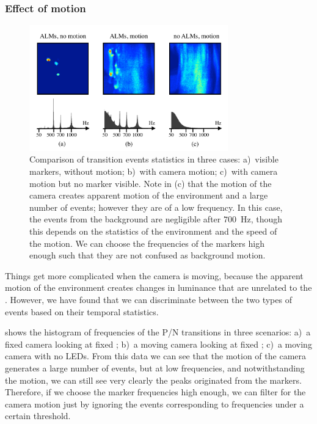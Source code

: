 \subsubsection{Effect of motion\label{sub:Alternate-events-and-motion}}

\begin{figure}[b]
\centering{}\includegraphics[width=8.6cm]{figures/slides/motion}\caption{\label{fig:switch-hist}Comparison of transition events statistics
in three cases: a)~visible markers, without motion; b)~with camera
motion; c)~with camera motion but no marker visible. Note in (c)
that the motion of the camera creates apparent motion of the environment
and a large number of events; however they are of a low frequency.
In this case, the events from the background are negligible after
$700$~Hz, though this depends on the statistics of the environment
and the speed of the motion. We can choose the frequencies of the
markers high enough such that they are not confused as background
motion.}
\end{figure}


Things get more complicated when the camera is moving, because the
apparent motion of the environment creates changes in luminance that
are unrelated to the \ALMs. However, we have found that we can discriminate
between the two types of events based on their temporal statistics.

 shows the histogram of frequencies of
the P/N transitions in three scenarios: a)~a fixed camera looking
at fixed \ALMs; b)~a moving camera looking at fixed \ALMs; c)~a
moving camera with no LEDs. From this data we can see that the motion
of the camera generates a large number of events, but at low frequencies,
and notwithstanding the motion, we can still see very clearly the
peaks originated from the markers. Therefore, if we choose the marker
frequencies high enough, we can filter for the camera motion just
by ignoring the events corresponding to frequencies under a certain
threshold. 
